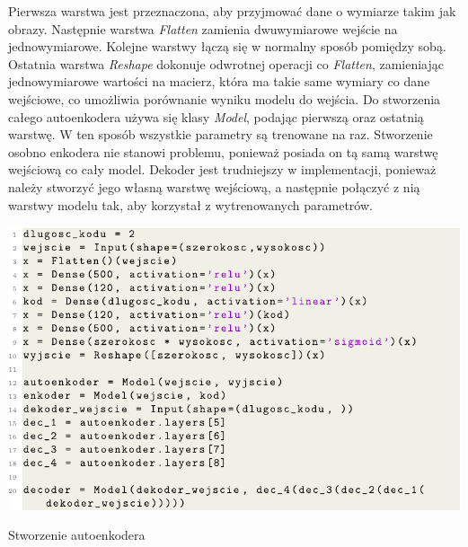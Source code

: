\documentclass[a4paper,12pt,oneside]{book} %
\begin{document}
Pierwsza warstwa jest przeznaczona, aby przyjmować dane o wymiarze takim jak obrazy. Następnie warstwa \textit{Flatten} zamienia dwuwymiarowe wejście na jednowymiarowe. Kolejne warstwy łączą się w normalny sposób pomiędzy sobą. Ostatnia warstwa \textit{Reshape} dokonuje odwrotnej operacji co \textit{Flatten}, zamieniając jednowymiarowe wartości na macierz, która ma takie same wymiary co dane wejściowe, co umożliwia porównanie wyniku modelu do wejścia. Do stworzenia całego autoenkodera używa się klasy \textit{Model}, podając pierwszą oraz ostatnią warstwę. W ten sposób wszystkie parametry są trenowane na raz. Stworzenie osobno enkodera nie stanowi problemu, ponieważ posiada on tą samą warstwę wejściową co cały model. Dekoder jest trudniejszy w implementacji, ponieważ należy stworzyć jego własną warstwę wejściową, a następnie połączyć z nią warstwy modelu tak, aby korzystał z wytrenowanych parametrów. 
\begin{code}[h!]
	\centering
	\includegraphics[width=\linewidth]{modelae.pdf}
	\caption{Stworzenie autoenkodera}
	\label{code:createae}
\end{code}
\end{document}
